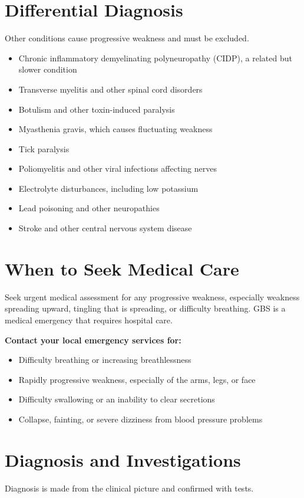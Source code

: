 \section*{Differential Diagnosis}
Other conditions cause progressive weakness and must be excluded.

\begin{itemize}
    \item Chronic inflammatory demyelinating polyneuropathy (CIDP), a related but slower condition
    \item Transverse myelitis and other spinal cord disorders
    \item Botulism and other toxin-induced paralysis
    \item Myasthenia gravis, which causes fluctuating weakness
    \item Tick paralysis
    \item Poliomyelitis and other viral infections affecting nerves
    \item Electrolyte disturbances, including low potassium
    \item Lead poisoning and other neuropathies
    \item Stroke and other central nervous system disease
\end{itemize}

\section*{When to Seek Medical Care}
Seek urgent medical assessment for any progressive weakness, especially weakness spreading upward, tingling that is spreading, or difficulty breathing. GBS is a medical emergency that requires hospital care.

\textbf{Contact your local emergency services for:}
\begin{itemize}
    \item Difficulty breathing or increasing breathlessness
    \item Rapidly progressive weakness, especially of the arms, legs, or face
    \item Difficulty swallowing or an inability to clear secretions
    \item Collapse, fainting, or severe dizziness from blood pressure problems
\end{itemize}

\section*{Diagnosis and Investigations}
Diagnosis is made from the clinical picture and confirmed with tests.


